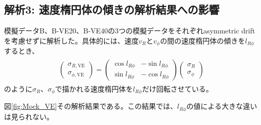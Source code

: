 \subsection{解析3: 速度楕円体の傾きの解析結果への影響 \label{解析3}}
模擬データB、B-VE20、B-VE40の3つの模擬データをそれぞれasymmetric driftを考慮せずに解析した。具体的には、速度$v_R$と$v_{\phi}$の間の速度楕円体の傾きを$l_{R\phi}$するとき、
\begin{align}
\begin{aligned}
	\left(
	\begin{array}{c}
	 	\sigma_{R,\mathrm{VE}}\\
	 	\sigma_{\phi,\mathrm{VE}}
	\end{array}
	\right)
	=
	\left(
	\begin{array}{cc}
	 	\cos{l_{R\phi}} & -\sin{l_{R\phi}}\\
	 	\sin{l_{R\phi}} & -\cos{l_{R\phi}}
	\end{array}
	\right)
	\left(
	\begin{array}{c}
	 	\sigma_R\\
	 	\sigma_{\phi}
	\end{array}
	\right)
\end{aligned}
\end{align}
のように$\sigma_R、\sigma_{\phi}$で描かれる速度楕円体を$l_{R\phi}$だけ回転させている。

図\ref{fig:Mock_VE}その解析結果である。この結果では、$l_{R\phi}$の値による大きな違いは見られない。

